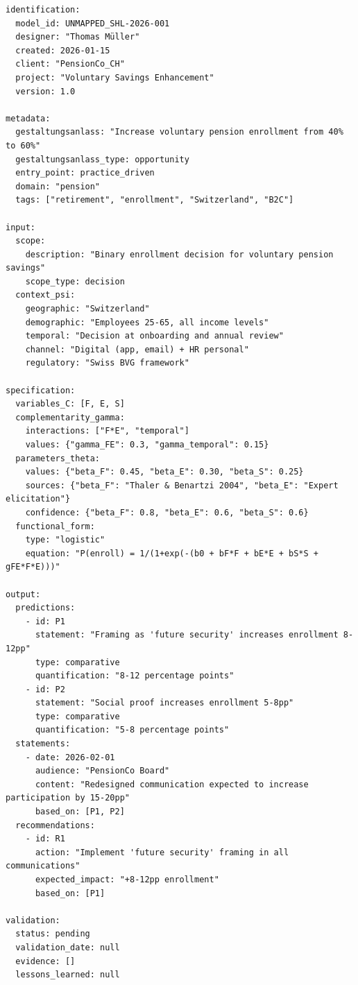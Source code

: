 \begin{tcolorbox}[colback=white, colframe=black,
    title=Example Registry Entry: UNMAPPED_SHL-2026-001]
\begin{verbatim}
identification:
  model_id: UNMAPPED_SHL-2026-001
  designer: "Thomas Müller"
  created: 2026-01-15
  client: "PensionCo_CH"
  project: "Voluntary Savings Enhancement"
  version: 1.0

metadata:
  gestaltungsanlass: "Increase voluntary pension enrollment from 40% to 60%"
  gestaltungsanlass_type: opportunity
  entry_point: practice_driven
  domain: "pension"
  tags: ["retirement", "enrollment", "Switzerland", "B2C"]

input:
  scope:
    description: "Binary enrollment decision for voluntary pension savings"
    scope_type: decision
  context_psi:
    geographic: "Switzerland"
    demographic: "Employees 25-65, all income levels"
    temporal: "Decision at onboarding and annual review"
    channel: "Digital (app, email) + HR personal"
    regulatory: "Swiss BVG framework"

specification:
  variables_C: [F, E, S]
  complementarity_gamma:
    interactions: ["F*E", "temporal"]
    values: {"gamma_FE": 0.3, "gamma_temporal": 0.15}
  parameters_theta:
    values: {"beta_F": 0.45, "beta_E": 0.30, "beta_S": 0.25}
    sources: {"beta_F": "Thaler & Benartzi 2004", "beta_E": "Expert elicitation"}
    confidence: {"beta_F": 0.8, "beta_E": 0.6, "beta_S": 0.6}
  functional_form:
    type: "logistic"
    equation: "P(enroll) = 1/(1+exp(-(b0 + bF*F + bE*E + bS*S + gFE*F*E)))"

output:
  predictions:
    - id: P1
      statement: "Framing as 'future security' increases enrollment 8-12pp"
      type: comparative
      quantification: "8-12 percentage points"
    - id: P2
      statement: "Social proof increases enrollment 5-8pp"
      type: comparative
      quantification: "5-8 percentage points"
  statements:
    - date: 2026-02-01
      audience: "PensionCo Board"
      content: "Redesigned communication expected to increase participation by 15-20pp"
      based_on: [P1, P2]
  recommendations:
    - id: R1
      action: "Implement 'future security' framing in all communications"
      expected_impact: "+8-12pp enrollment"
      based_on: [P1]

validation:
  status: pending
  validation_date: null
  evidence: []
  lessons_learned: null
\end{verbatim}
\end{tcolorbox}



